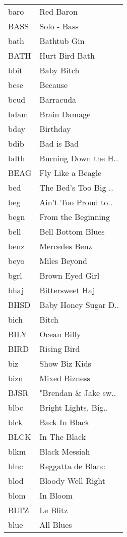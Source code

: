 \begin{supertabular}{ll}
 baro &             Red Baron \\
 BASS &           Solo - Bass \\
 bath &           Bathtub Gin \\
 BATH &        Hurt Bird Bath \\
 bbit &            Baby Bitch \\
 bcse &               Because \\
 bcud &             Barracuda \\
 bdam &          Brain Damage \\
 bday &              Birthday \\
 bdib &            Bad is Bad \\
 bdth &  Burning Down the H.. \\
 BEAG &     Fly Like a Beagle \\
  bed &  The Bed's Too Big .. \\
  beg &  Ain't Too Proud to.. \\
 begn &    From the Beginning \\
 bell &     Bell Bottom Blues \\
 benz &         Mercedes Benz \\
 beyo &          Miles Beyond \\
 bgrl &       Brown Eyed Girl \\
 bhaj &       Bittersweet Haj \\
 BHSD &  Baby Honey Sugar D.. \\
 bich &                 Bitch \\
 BILY &           Ocean Billy \\
 BIRD &           Rising Bird \\
  biz &         Show Biz Kids \\
 bizn &         Mixed Bizness \\
 BJSR &  "Brendan \& Jake sw.. \\
 blbc &  Bright Lights, Big.. \\
 blck &         Back In Black \\
 BLCK &          In The Black \\
 blkm &         Black Messiah \\
 blnc &     Reggatta de Blanc \\
 blod &     Bloody Well Right \\
 blom &              In Bloom \\
 BLTZ &              Le Blitz \\
 blue &             All Blues \\

\end{supertabular}
